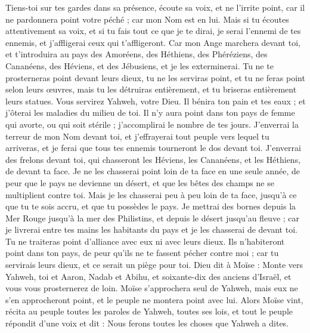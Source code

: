 \begin{multicols}{2}
Tiens-toi sur tes gardes dans sa présence, écoute sa voix, et ne l'irrite point, car il ne pardonnera point votre péché ; car mon Nom est en lui.
Mais si tu écoutes attentivement sa voix, et si tu fais tout ce que je te dirai, je serai l'ennemi de tes ennemis, et j'affligerai ceux qui t'affligeront.
Car mon Ange marchera devant toi, et t'introduira au pays des Amoréens, des Héthiens, des Phéréziens, des Cananéens, des Héviens, et des Jébusiens, et je les exterminerai.
Tu ne te prosterneras point devant leurs dieux, tu ne les serviras point, et tu ne feras point selon leurs œuvres, mais tu les détruiras entièrement, et tu briseras entièrement leurs statues.
Vous servirez Yahweh, votre Dieu. Il bénira ton pain et tes eaux ; et j'ôterai les maladies du milieu de toi.
Il n'y aura point dans ton pays de femme qui avorte, ou qui soit stérile ; j'accomplirai le nombre de tes jours.
J'enverrai la terreur de mon Nom devant toi, et j'effrayerai tout peuple vers lequel tu arriveras, et je ferai que tous tes ennemis tourneront le dos devant toi.
J'enverrai des frelons devant toi, qui chasseront les Héviens, les Cananéens, et les Héthiens, de devant ta face.
Je ne les chasserai point loin de ta face en une seule année, de peur que le pays ne devienne un désert, et que les bêtes des champs ne se multiplient contre toi.
Mais je les chasserai peu à peu loin de ta face, jusqu'à ce que tu te sois accru, et que tu possèdes le pays.
Je mettrai des bornes depuis la Mer Rouge jusqu'à la mer des Philistins, et depuis le désert jusqu'au fleuve ; car je livrerai entre tes mains les habitants du pays et je les chasserai de devant toi.
Tu ne traiteras point d'alliance avec eux ni avec leurs dieux.
Ils n'habiteront point dans ton pays, de peur qu'ils ne te fassent pécher contre moi ; car tu servirais leurs dieux, et ce serait un piège pour toi.
\VerseOne{}Dieu dit à Moïse : Monte vers Yahweh, toi et Aaron, Nadab et Abihu, et soixante-dix des anciens d'Israël, et vous vous prosternerez de loin.
Moïse s'approchera seul de Yahweh, mais eux ne s'en approcheront point, et le peuple ne montera point avec lui.
Alors Moïse vint, récita au peuple toutes les paroles de Yahweh, toutes ses lois, et tout le peuple répondit d'une voix et dit : Nous ferons toutes les choses que Yahweh a dites.

\end{multicols}
